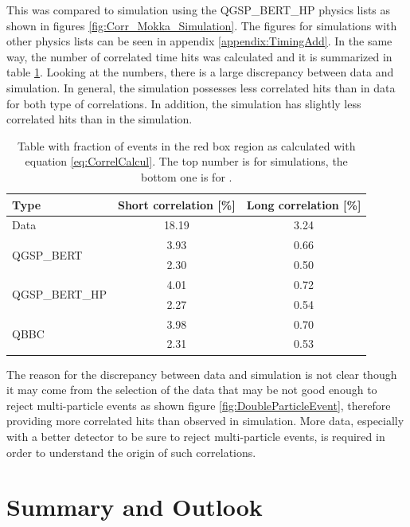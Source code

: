 This was compared to simulation using the QGSP\_BERT\_HP physics lists as shown in figures \ref{fig:Corr_Mokka_Simulation}. The figures for simulations with other physics lists can be seen in appendix \ref{appendix:TimingAdd}. In the same way, the number of correlated time hits was calculated and it is summarized in table \ref{table:Correlation_DataSim}. Looking at the numbers, there is a large discrepancy between data and simulation. In general, the simulation possesses less correlated hits than in data for both type of correlations. In addition, the \ddhep simulation has slightly less correlated hits than in the \mokka simulation.

\begin{table}[htb!]
	\centering
	\renewcommand*{\arraystretch}{1.3}
	\caption{Table with fraction of events in the red box region as calculated with equation \ref{eq:CorrelCalcul}. The top number is for \mokka simulations, the bottom one is for \ddhep.}
	\label{table:Correlation_DataSim}
	\begin{tabular}{@{} lcc @{}}
		\toprule
		Type & Short correlation [\%] & Long correlation [\%]\\
		\midrule
		\multirow{2}{*}{Data} & \multirow{2}{*}{18.19} & \multirow{2}{*}{3.24}\\ & &\\
		\midrule
		\multirow{2}{*}{QGSP\_BERT} & 3.93 & 0.66\\ & 2.30 & 0.50\\
		\multirow{2}{*}{QGSP\_BERT\_HP} & 4.01 & 0.72\\ & 2.27 & 0.54\\
		\multirow{2}{*}{QBBC} & 3.98 & 0.70\\ & 2.31 & 0.53\\
		\bottomrule
	\end{tabular}
\end{table}

The reason for the discrepancy between data and simulation is not clear though it may come from the selection of the data that may be not good enough to reject multi-particle events as shown figure \ref{fig:DoubleParticleEvent}, therefore providing more correlated hits than observed in simulation. More data, especially with a better detector to be sure to reject multi-particle events, is required in order to understand the origin of such correlations.

\newpage
\section{Summary and Outlook}

